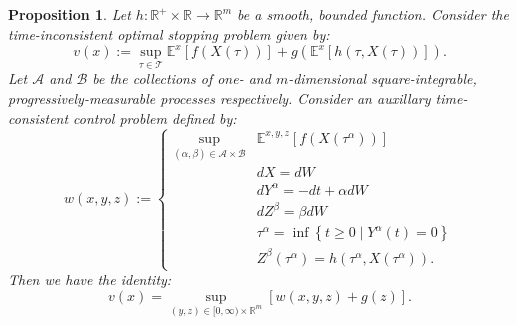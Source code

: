 \documentclass[11pt]{article}
\newtheorem{prop}{Proposition}
\begin{document}
\begin{prop}
Let $h:\mathbb{R}^+\times\mathbb{R}\to\mathbb{R}^m$ be a smooth, bounded function. Consider the time-inconsistent optimal stopping problem given by:
\begin{equation}\label{Eqn:GeneralTimeInconsistent}
v(x) := \sup\limits_{\tau\in\mathcal{T}}\mathbb{E}^x\left[f(X(\tau))\right]+ g(\mathbb{E}^x\left[h(\tau,X(\tau))\right]).
\end{equation}
Let $\mathcal{A}$ and $\mathcal{B}$ be the collections of one- and $m$-dimensional square-integrable, progressively-measurable processes respectively. Consider an auxillary time-consistent control problem defined by:
\begin{equation}\label{Eqn:GeneralAuxFunction2}
w(x,y,z):=\left\{\begin{array}{rl}
\sup\limits_{(\alpha,\beta)\in\mathcal{A}\times\mathcal{B}}&\mathbb{E}^{x,y,z}\left[f(X(\tau^\alpha))\right]\\
& dX = dW\\
& dY^\alpha = -dt + \alpha dW\\
& dZ^\beta = \beta dW\\
& \tau^\alpha = \inf\left\{t\geq 0\mid Y^\alpha(t)=0\right\}\\
& Z^\beta(\tau^\alpha) = h(\tau^\alpha,X(\tau^\alpha)).
\end{array}\right.
\end{equation}
Then we have the identity:
\begin{equation}
v(x) = \sup\limits_{(y,z)\in[0,\infty)\times\mathbb{R}^m}\left[w(x,y,z)+g(z)\right].
\end{equation}
\end{prop}
\end{document}
